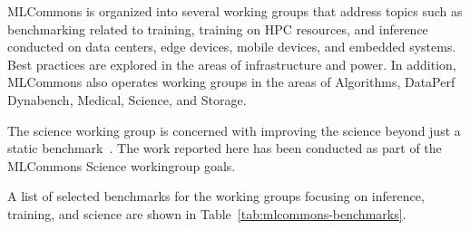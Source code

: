 \documentclass[utf8]{FrontiersinVancouver} %
\begin{document}
MLCommons is organized into several working groups that address topics such as benchmarking related to training, training on HPC resources, and inference conducted on data centers, edge devices, mobile devices, and embedded systems. Best practices are explored in the areas of infrastructure and power. In addition, MLCommons also operates working groups in the areas of Algorithms, DataPerf Dynabench, Medical, Science, and Storage.

The science working group is concerned with improving the science beyond just a static benchmark~\citep{las-22-mlcommons-science}.  The work reported here has been conducted as part of the MLCommons Science workingroup goals.

A list of selected benchmarks for the working groups focusing on inference, training, and science are shown in Table~\ref{tab:mlcommons-benchmarks}.
\end{document}
